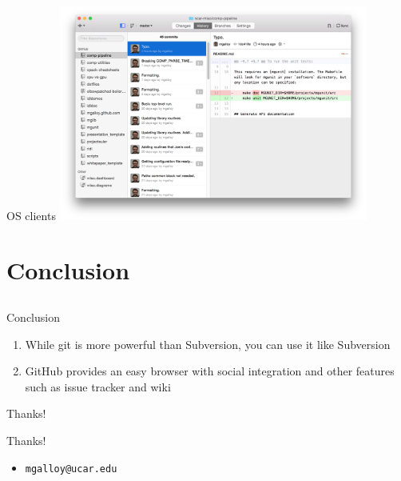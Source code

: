 \documentclass{beamer}
\begin{document}
\begin{frame}{OS clients}
  \includegraphics[width=4in]{mac-client.png}
\end{frame}


\section{Conclusion}
\subsection*{}

\begin{frame}{Conclusion}
  \begin{enumerate}
    \item While git is more powerful than Subversion, you can use it like Subversion
    \item GitHub provides an easy browser with social integration and other features such as issue tracker and wiki
  \end{enumerate}
\end{frame}

\begin{frame}{Thanks!}
  \begin{center}{\huge Thanks!}\end{center}
  \begin{itemize}
    \item {\tt mgalloy@ucar.edu}
  \end{itemize}
\end{frame}
\end{document}
